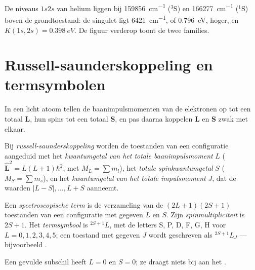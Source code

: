 \begin{example}\label{ex:b3:many-electron-atoms:K}
De niveaus $1s2s$ van helium liggen bij \qty{159856}{cm^{-1}} (${}^3$S) en
\qty{166277}{cm^{-1}} (${}^1$S) boven de grondtoestand: de singulet ligt
\qty{6421}{cm^{-1}}, of \qty{0.796}{eV}, hoger, en $K(1s,2s) = \qty{0.398}{eV}$.
De figuur verderop toont de twee families.
\end{example}

\section{Russell-saunderskoppeling en termsymbolen}

In een licht atoom tellen de baanimpulsmomenten van de elektronen op tot
een totaal $\mathbf L$, hun spins tot een totaal $\mathbf S$, en pas daarna
koppelen
$\mathbf L$ en $\mathbf S$ zwak met elkaar.

\begin{definition}\label{def:b3:many-electron-atoms:russell-saunders}
Bij \emph{russell-saunderskoppeling} worden de
toestanden van een configuratie aangeduid met het \emph{kwantumgetal van
het totale baanimpulsmoment}
$L$ ($\hat{\mathbf L}^2 = L(L+1)\hbar^2$, met $M_L = \sum m_l$), het \emph{totale
spinkwantumgetal} $S$ ($M_S = \sum m_s$),
en het \emph{kwantumgetal van het totale impulsmoment}
$J$, dat de waarden $|L - S|, \dots, L + S$ aanneemt.
\end{definition}

\begin{definition}\label{def:b3:many-electron-atoms:term}
Een \emph{spectroscopische term} is de
verzameling van de
$(2L+1)(2S+1)$ toestanden van een configuratie met gegeven $L$ en $S$. Zijn
\emph{spinmultipliciteit} is $2S + 1$. Het
\emph{termsymbool}
 is ${}^{2S+1}L$, met de letters S, P, D, F, G, H
voor $L = 0, 1, 2, 3, 4, 5$; een toestand met gegeven $J$ wordt geschreven als ${}^{2S+1}L_J$ ---
bijvoorbeeld .
\end{definition}

\begin{proposition}\label{prop:b3:many-electron-atoms:closed-shell}
Een gevulde subschil heeft $L = 0$ en $S = 0$; ze draagt niets bij aan het
.
\end{proposition}

